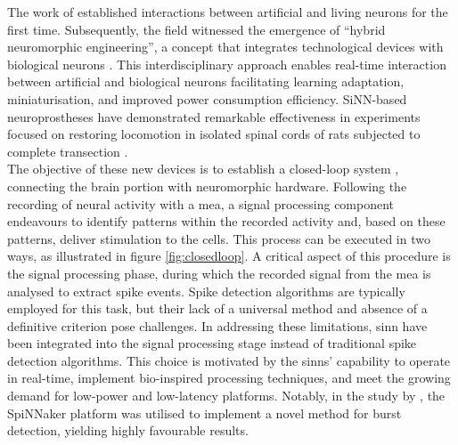 The work of \cite{LEMASSON} established interactions between artificial and living neurons for the first time. Subsequently, the field witnessed the emergence of \enquote{hybrid neuromorphic engineering}, a concept that integrates technological devices with biological neurons \cite{Khoyratee}. This interdisciplinary approach enables real-time interaction between artificial and biological neurons \cite{Jung} facilitating learning adaptation, miniaturisation, and improved power consumption efficiency. SiNN-based neuroprostheses have demonstrated remarkable effectiveness in experiments focused on restoring locomotion in isolated spinal cords of rats subjected to complete transection \cite{Joucla}.\\

The objective of these new devices is to establish a closed-loop system \cite{LeviClosedLoop}, connecting the brain portion with neuromorphic hardware. Following the recording of neural activity with a \acrfull{mea}, a signal processing component endeavours to identify patterns within the recorded activity and, based on these patterns, deliver stimulation to the cells. This process can be executed in two ways, as illustrated in figure \ref{fig:closedloop}. A critical aspect of this procedure is the signal processing phase, during which the recorded signal from the \acrshort{mea} is analysed to extract spike events. Spike detection algorithms are typically employed for this task, but their lack of a universal method and absence of a definitive criterion pose challenges. In addressing these limitations, \acrshort{sinn} have been integrated into the signal processing stage instead of traditional spike detection algorithms. This choice is motivated by the \acrshort{sinn}s' capability to operate in real-time, implement bio-inspired processing techniques, and meet the growing demand for low-power and low-latency platforms. Notably, in the study by \cite{DOMINGUEZMORALES}, the SpiNNaker platform was utilised to implement a novel method for burst detection, yielding highly favourable results.\\

